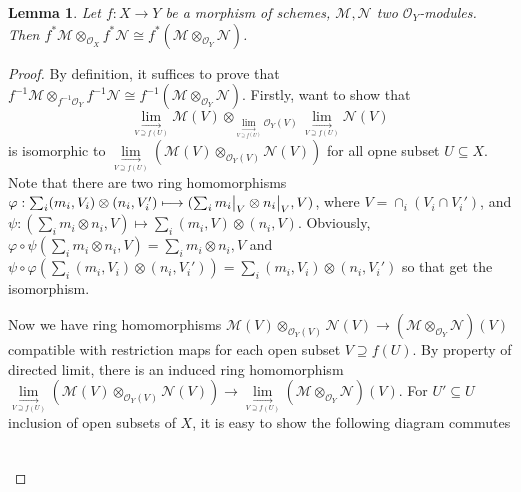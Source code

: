 \documentclass{ctexart}
\newtheorem{lemma}{Lemma}[section]
\begin{document}
\begin{lemma}
    Let $f: X \longrightarrow Y$ be a morphism of schemes, $\mathcal{M}, \mathcal{N}$ two $\mathcal{O}_{Y}$-modules.
    Then $f^{\ast}\mathcal{M} \otimes_{\mathcal{O}_{X}} f^{\ast}\mathcal{N} \cong f^{\ast}(\mathcal{M} \otimes_{\mathcal{O}_{Y}} \mathcal{N})$.
    \label{Lemma 6.2}
\end{lemma}
\begin{proof}
    By definition, it suffices to prove that $f^{-1}\mathcal{M} \otimes_{f^{-1}\mathcal{O}_{Y}} f^{-1}\mathcal{N} \cong f^{-1}(\mathcal{M} \otimes_{\mathcal{O}_{Y}} \mathcal{N})$.
    Firstly, want to show that
    \begin{equation*}
        \underset{\underset{V \supseteq f(U)}{\longrightarrow}}{\lim} \mathcal{M}(V) \otimes_{\underset{\underset{V \supseteq f(U)}{\longrightarrow}}{\lim} \mathcal{O}_{Y}(V)} \underset{\underset{V \supseteq f(U)}{\longrightarrow}}{\lim} \mathcal{N}(V)
    \end{equation*}
    is isomorphic to $\underset{\underset{V \supseteq f(U)}{\longrightarrow}}{\lim} (\mathcal{M}(V) \otimes_{\mathcal{O}_{Y}(V)} \mathcal{N}(V))$ for all opne subset $U \subseteq X$.
    Note that there are two ring homomorphisms $\varphi: \sum_{i} (m_{i}, V_{i}) \otimes (n_{i}, V_{i}') \longmapsto (\sum_{i} m_{i}\big{|}_{V} \otimes n_{i}\big{|}_{V}, V)$, where $V = \cap_{i} (V_{i} \cap V_{i}')$,
    and $\psi: (\sum_{i} m_{i} \otimes n_{i}, V) \longmapsto \sum_{i} (m_{i}, V) \otimes (n_{i}, V)$.
    Obviously, $\varphi \circ \psi(\sum_{i} m_{i} \otimes n_{i}, V) = \sum_{i} m_{i} \otimes n_{i}, V$ and $\psi \circ \varphi(\sum_{i} (m_{i}, V_{i}) \otimes (n_{i}, V_{i}')) = \sum_{i} (m_{i}, V_{i}) \otimes (n_{i}, V_{i}')$ so that get the isomorphism.
    \par
    Now we have ring homomorphisms $\mathcal{M}(V) \otimes_{\mathcal{O}_{Y}(V)} \mathcal{N}(V) \longrightarrow (\mathcal{M} \otimes_{\mathcal{O}_{Y}} \mathcal{N})(V)$ compatible with restriction maps for each open subset $V \supseteq f(U)$.
    By property of directed limit, there is an induced ring homomorphism $\underset{\underset{V \supseteq f(U)}{\longrightarrow}}{\lim} (\mathcal{M}(V) \otimes_{\mathcal{O}_{Y}(V)} \mathcal{N}(V)) \longrightarrow \underset{\underset{V \supseteq f(U)}{\longrightarrow}}{\lim} (\mathcal{M} \otimes_{\mathcal{O}_{Y}} \mathcal{N})(V)$.
    For $U' \subseteq U$ inclusion of open subsets of $X$, it is easy to show the following diagram commutes
    \begin{equation*}
        \begin{tikzcd}

\end{tikzcd}
\end{equation*}
\end{proof}
\end{document}
